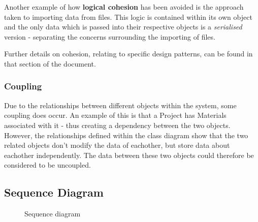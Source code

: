 \documentclass[
  english,
  a4paper,
,tablecaptionabove
]{scrartcl}
\begin{document}
Another example of how \textbf{logical cohesion} has been avoided is the
approach taken to importing data from files. This logic is contained
within its own object and the only data which is passed into their
respective objects is a \emph{serialised} version - separating the
concerns surrounding the importing of files.

Further details on cohesion, relating to specific design patterns, can
be found in that section of the document.

\hypertarget{coupling}{%
\subsubsection{Coupling}\label{coupling}}

Due to the relationships between different objects within the system,
some coupling does occur. An example of this is that a Project has
Materials associated with it - thus creating a dependency between the
two objects. However, the relationships defined within the class diagram
show that the two related objects don't modify the data of eachother,
but store data about eachother independently. The data between these two
objects could therefore be considered to be uncoupled.

\newpage

\begin{landscape}

\pagestyle{empty}

\hypertarget{sequence-diagram}{%
\section{Sequence Diagram}\label{sequence-diagram}}

\begin{figure}
    \caption{Sequence diagram} \label{fig:sequence_diagram}
\end{figure}

\end{landscape}
\end{document}
